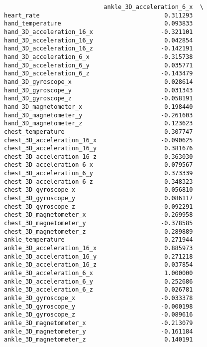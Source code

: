 \documentclass[11pt]{article}
\begin{document}
\begin{verbatim}
                            ankle_3D_acceleration_6_x  \
heart_rate                                   0.311293   
hand_temperature                             0.093833   
hand_3D_acceleration_16_x                   -0.321101   
hand_3D_acceleration_16_y                    0.042854   
hand_3D_acceleration_16_z                   -0.142191   
hand_3D_acceleration_6_x                    -0.315738   
hand_3D_acceleration_6_y                     0.035771   
hand_3D_acceleration_6_z                    -0.143479   
hand_3D_gyroscope_x                          0.028614   
hand_3D_gyroscope_y                          0.031343   
hand_3D_gyroscope_z                         -0.058191   
hand_3D_magnetometer_x                       0.198440   
hand_3D_magnetometer_y                      -0.261603   
hand_3D_magnetometer_z                       0.123623   
chest_temperature                            0.307747   
chest_3D_acceleration_16_x                  -0.090625   
chest_3D_acceleration_16_y                   0.381676   
chest_3D_acceleration_16_z                  -0.363030   
chest_3D_acceleration_6_x                   -0.079567   
chest_3D_acceleration_6_y                    0.373339   
chest_3D_acceleration_6_z                   -0.348323   
chest_3D_gyroscope_x                        -0.056810   
chest_3D_gyroscope_y                         0.086117   
chest_3D_gyroscope_z                        -0.092291   
chest_3D_magnetometer_x                     -0.269958   
chest_3D_magnetometer_y                     -0.378585   
chest_3D_magnetometer_z                      0.289889   
ankle_temperature                            0.271944   
ankle_3D_acceleration_16_x                   0.885973   
ankle_3D_acceleration_16_y                   0.271218   
ankle_3D_acceleration_16_z                   0.037854   
ankle_3D_acceleration_6_x                    1.000000   
ankle_3D_acceleration_6_y                    0.252686   
ankle_3D_acceleration_6_z                    0.026781   
ankle_3D_gyroscope_x                        -0.033378   
ankle_3D_gyroscope_y                        -0.000198   
ankle_3D_gyroscope_z                        -0.089616   
ankle_3D_magnetometer_x                     -0.213079   
ankle_3D_magnetometer_y                     -0.161184   
ankle_3D_magnetometer_z                      0.140191   


\end{verbatim}
\end{document}
